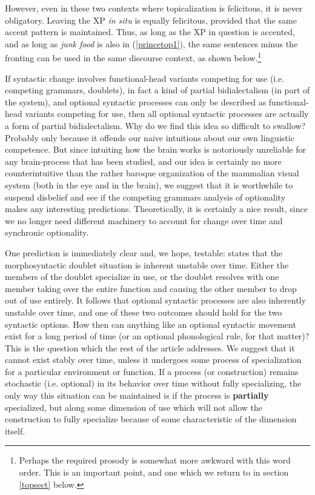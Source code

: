 However, even in these two contexts where topicalization is felicitous, it is never obligatory. Leaving the XP \textsl{in situ} is equally felicitous, provided that the same accent pattern is maintained. Thus, as long as the XP in question is accented, and as long as \textsl{junk food} is also in (\ref{princetop1}), the same sentences minus the fronting can be used in the same discourse context, as shown below.\footnote{Perhaps the required prosody is somewhat more awkward with this word order. This is an important point, and one which we return to in section \ref{topsect} below.}




If syntactic change involves functional-head variants competing for use (i.e. competing grammars, doublets), in fact a kind of partial bidialectalism (in part of the system), and optional syntactic processes can only be described as functional-head variants competing for use, then all optional syntactic processes are actually a form of partial bidialectalism. Why do we find this idea so difficult to swallow? Probably only because it offends our naive intuitions about our own linguistic competence. But since intuiting how the brain works is notoriously unreliable for any brain-process that has been studied, and our idea is certainly no more counterintuitive than the rather baroque organization of the mammalian visual system (both in the eye and in the brain), we suggest that it is worthwhile to suspend disbelief and see if the competing grammars analysis of optionality makes any interesting predictions. Theoretically, it is certainly a nice result, since we no longer need different machinery to account for change over time and synchronic optionality. 

One prediction is immediately clear and, we hope, testable: \citet{kroch1989,kroch1994} states that the morphosyntactic doublet situation is inherent unstable over time. Either the members of the doublet specialize in use, or the doublet resolves with one member taking over the entire function and causing the other member to drop out of use entirely. It follows that optional syntactic processes are also inherently unstable over time, and one of these two outcomes should hold for the two syntactic options. How then can anything like an optional syntactic movement exist for a long period of time (or an optional phonological rule, for that matter)? This is the question which the rest of the article addresses. We suggest that it cannot exist stably over time, unless it undergoes some process of specialization for a particular environment or function. If a process (or construction) remains stochastic (i.e. optional) in its behavior over time without fully specializing, the only way this situation can be maintained is if the process is \textbf{partially} specialized, but along some dimension of use which will not allow the construction to fully specialize because of some characteristic of the dimension itself.

